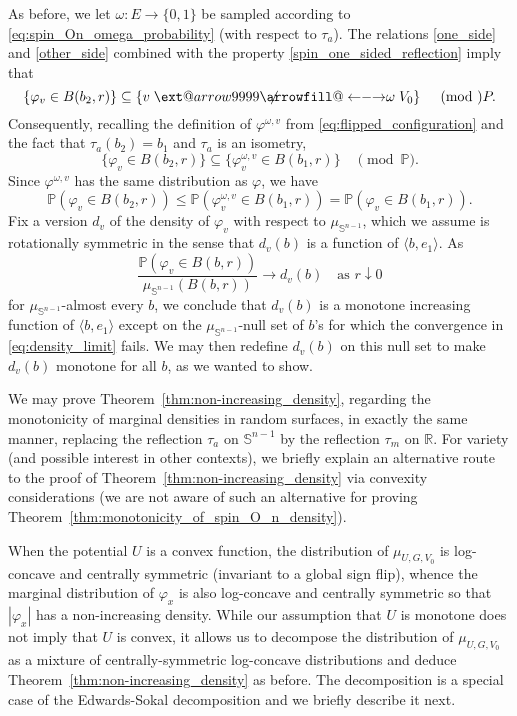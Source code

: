 \documentclass[english]{article}
\makeatletter
\renewcommand{\P}{\mathbb{P}}
\newcommand\xleftrightarrow[2][]{%
  \ext@arrow 9999{\longleftrightarrowfill@}{#1}{#2}}
\newcommand\longleftrightarrowfill@{%
  \arrowfill@\leftarrow\relbar\rightarrow}
\theoremstyle{plain}
\theoremstyle{plain}
\makeatother
\begin{document}
As before, we let $\omega:E\to\{0,1\}$ be sampled
according to \eqref{eq:spin_On_omega_probability} (with respect to $\tau_a$). The relations \eqref{one_side} and \eqref{other_side} combined with the property
\eqref{spin_one_sided_reflection} imply that
\begin{equation*}
  \{\varphi_v\in B(b_2, r)\}\subseteq\{v\centernot{\xleftrightarrow{\omega}}V_0\}\quad\pmod\P.
\end{equation*}
Consequently, recalling the definition of $\varphi^{\omega, v}$ from \eqref{eq:flipped_configuration} and the fact that $\tau_a(b_2)=b_1$ and $\tau_a$ is an isometry,
\[
\{\varphi_v\in B(b_2, r) \} \subseteq \{\varphi^{\omega, v}_v\in B(b_1, r)\}\quad\pmod\P.
\]
Since $\varphi^{\omega,v}$ has the same distribution as $\varphi$, we have
\[
\mathbb{P}\left(\varphi_v\in B(b_2,r)\right)\le \mathbb{P}\left(\varphi^{\omega,v}_v\in B(b_1,r)\right) = \mathbb{P}\left(\varphi_v\in B(b_1,r)\right).
\]
Fix a version $d_v$ of the density of $\varphi_v$ with respect to $\mu_{\mathbb{S}^{n-1}}$, which we assume is rotationally symmetric in the sense that $d_v(b)$ is a function of $\langle b, e_1\rangle$. As
\begin{equation}\label{eq:density_limit}
  \frac{\mathbb{P}\left(\varphi_v\in B(b,r)\right)}{\mu_{\mathbb{S}^{n-1}}(B(b,r))}\to d_v(b)\quad\text{as $r\downarrow0$}
\end{equation}
for $\mu_{\mathbb{S}^{n-1}}$-almost every $b$, we conclude that $d_v(b)$ is a monotone increasing function of $\langle b, e_1\rangle$ except on the $\mu_{\mathbb{S}^{n-1}}$-null set of $b$'s for which the convergence in \eqref{eq:density_limit} fails. We may then redefine $d_v(b)$ on this null set to make $d_v(b)$ monotone for all $b$, as we wanted to show.

\medskip
We may prove Theorem~\ref{thm:non-increasing_density}, regarding the monotonicity of marginal densities in random surfaces, in exactly the same manner, replacing the reflection $\tau_a$ on $\mathbb{S}^{n-1}$ by the reflection $\tau_m$ on $\mathbb{R}$. For variety (and possible interest in other contexts), we briefly explain an alternative route to the proof of Theorem~\ref{thm:non-increasing_density} via convexity considerations (we are not aware of such an alternative for proving Theorem~\ref{thm:monotonicity_of_spin_O_n_density}).

When the potential $U$ is a convex function, the distribution of $\mu_{U,G,V_0}$ is log-concave and centrally symmetric (invariant to a global sign flip), whence the marginal distribution of $\varphi_x$ is also log-concave and centrally symmetric so that $|\varphi_x|$ has a non-increasing density. While our assumption that $U$ is monotone does not imply that $U$ is convex, it allows us to decompose the distribution of $\mu_{U,G,V_0}$ as a mixture of centrally-symmetric log-concave distributions and deduce Theorem~\ref{thm:non-increasing_density} as before. The decomposition is a special case of the Edwards-Sokal decomposition \cite{edwards1988generalization} and we briefly describe it next.
\end{document}
